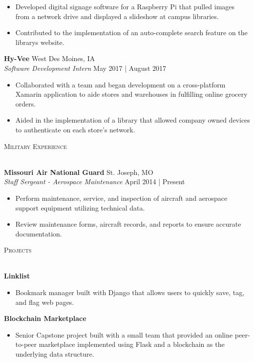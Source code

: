 \documentclass[a4paper]{article}
\newcommand{\lineunder} {
    \vspace*{-8pt} \\
    \hspace*{-18pt} \hrulefill \\
}
\newcommand{\header} [1] {
    {\hspace*{-18pt}\vspace*{6pt} \textsc{#1}}
    \vspace*{-6pt} \lineunder
}
\begin{document}
\vspace{-1mm}
\begin{itemize} \itemsep 1pt
	\item Developed digital signage software for a Raspberry Pi that pulled images from a network drive and displayed a slideshow at campus libraries.
	\item Contributed to the implementation of an auto-complete search feature on the library\textquotesingle{}s website.
\end{itemize}
\textbf{Hy-Vee} \hfill West Des Moines, IA\\
\textit{Software Development Intern} \hfill May 2017 | August 2017\\
\vspace{-1mm}
\begin{itemize} \itemsep 1pt
	\item Collaborated with a team and began development on a cross-platform Xamarin application to aide stores and warehouses in fulfilling online grocery orders.
	\item Aided in the implementation of a library that allowed company owned devices to authenticate on each store's network.
\end{itemize}

\header{Military Experience}
\vspace{1mm}

\textbf{Missouri Air National Guard} \hfill St. Joseph, MO\\
\textit{Staff Sergeant - Aerospace Maintenance} \hfill April 2014 | Present\\
\vspace{-1mm}
\begin{itemize} \itemsep 1pt
	\item Perform maintenance, service, and inspection of aircraft and aerospace support equipment utilizing technical data.
	\item Review maintenance forms, aircraft records, and reports to ensure accurate documentation.
\end{itemize}

\header{Projects}
\vspace{1mm}

\textbf{Linklist}
\vspace{-1mm}
\begin{itemize} \itemsep 1pt
	\item Bookmark manager built with Django that allows users to quickly save, tag, and flag web pages.
\end{itemize}
\textbf{Blockchain Marketplace}
\vspace{-1mm}
\begin{itemize} \itemsep 1pt
       \item Senior Capstone project built with a small team that provided an online peer-to-peer marketplace implemented using Flask and a blockchain as the underlying data structure.
\end{itemize}
\end{document}

